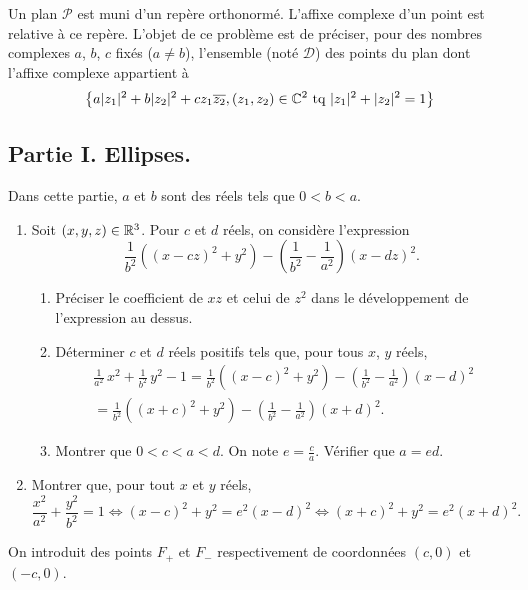 \noindent
Un plan $\mathcal P$ est muni d'un repère orthonormé. L'affixe complexe d'un point est relative à ce repère.\newline
L'objet de ce problème est de préciser, pour des nombres complexes $a$, $b$, $c$ fixés ($a\neq b$), l'ensemble (noté $\mathcal D$) des points du plan dont l'affixe complexe appartient à
\begin{displaymath}
 \left\lbrace a|z_1|^2 + b|z_2|^2 + cz_1\overline{z_2}, (z_1,z_2)\in \mathbb{C}^2 \text{ tq } |z_1|^2 + |z_2|^2 = 1 \right\rbrace 
\end{displaymath}

\subsection*{Partie I. Ellipses.}
Dans cette partie, $a$ et $b$ sont des réels tels que $0 < b < a$.
\begin{enumerate}
  \item Soit $(x,y,z) \in \mathbb{R}^3$. Pour $c$ et $d$ réels, on considère l'expression  
\[
  \frac{1}{b^2}\left( (x-cz)^2 + y^2\right) -\left( \frac{1}{b^2}-\frac{1}{a^2}\right) (x - dz)^2. 
\]
\begin{enumerate}
  \item Préciser le coefficient de $xz$ et celui de $z^2$ dans le développement de l'expression au dessus.
  \item Déterminer $c$ et $d$ réels positifs tels que, pour tous $x$, $y$ réels,
\begin{multline*}
\frac{1}{a^2}\,x^2 + \frac{1}{b^2}\,y^2 - 1 
= \frac{1}{b^2}\left( (x-c)^2 + y^2\right) -\left( \frac{1}{b^2}-\frac{1}{a^2}\right) (x - d)^2\\
= \frac{1}{b^2}\left( (x+c)^2 + y^2\right) -\left( \frac{1}{b^2}-\frac{1}{a^2}\right) (x + d)^2.
\end{multline*}
  \item  Montrer que $0 < c < a < d$. On note $e = \frac{c}{a}$. Vérifier que $a = ed$.
\end{enumerate}
\item Montrer que, pour tout $x$ et $y$ réels,
\[
  \frac{x^2}{a^2} + \frac{y^2}{b^2} = 1
  \Leftrightarrow 
  (x-c)^2 + y^2 = e^2(x-d)^2
  \Leftrightarrow
  (x + c)^2 + y^2 = e^2(x + d)^2.
\]
\setcounter{numquestion}{\value{enumi}}
\end{enumerate}
On introduit des points $F_+$ et $F_-$ respectivement de coordonnées $(c,0)$ et $(-c,0)$.\newline
